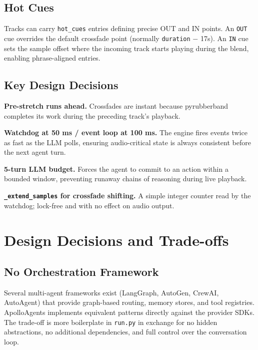 \documentclass[11pt,a4paper]{article}
\begin{document}
\subsection{Hot Cues}

Tracks can carry \texttt{hot\_cues} entries defining precise OUT and IN
points. An \texttt{OUT} cue overrides the default crossfade point (normally
\texttt{duration} $-$ 17s). An \texttt{IN} cue sets the sample offset where
the incoming track starts playing during the blend, enabling phrase-aligned
entries.

\subsection{Key Design Decisions}

\textbf{Pre-stretch runs ahead.} Crossfades are instant because pyrubberband
completes its work during the preceding track's playback.

\textbf{Watchdog at 50 ms / event loop at 100 ms.} The engine fires events
twice as fast as the LLM polls, ensuring audio-critical state is always
consistent before the next agent turn.

\textbf{5-turn LLM budget.} Forces the agent to commit to an action within a
bounded window, preventing runaway chains of reasoning during live playback.

\textbf{\texttt{\_extend\_samples} for crossfade shifting.} A simple integer
counter read by the watchdog; lock-free and with no effect on audio output.

\section{Design Decisions and Trade-offs}

\subsection{No Orchestration Framework}

Several multi-agent frameworks exist (LangGraph, AutoGen, CrewAI, AutoAgent)
that provide graph-based routing, memory stores, and tool registries.
ApolloAgents implements equivalent patterns directly against the provider
SDKs. The trade-off is more boilerplate in \texttt{run.py} in exchange for
no hidden abstractions, no additional dependencies, and full control over the
conversation loop.
\end{document}
